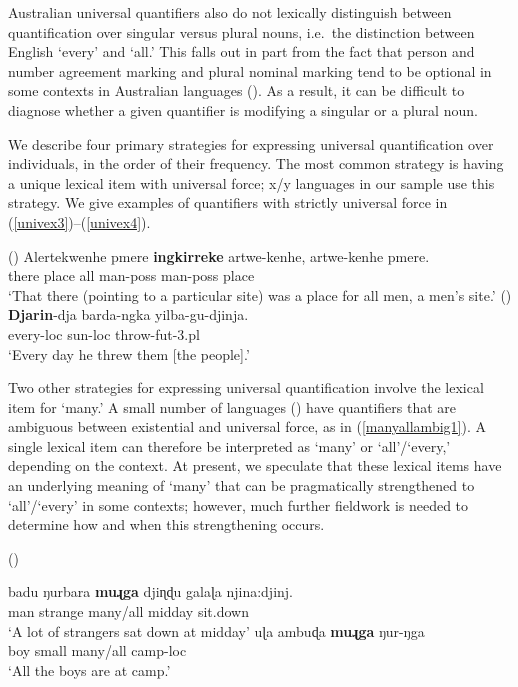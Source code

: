 \documentclass[12pt,egregdoesnotlikesansseriftitles]{scrartcl}
\begin{document}
Australian universal quantifiers also do not lexically distinguish between quantification over singular versus plural nouns, i.e.\ the distinction between English `every' and `all.' This falls out in part from the fact that person and number agreement marking and plural nominal marking tend to be optional in some contexts in Australian languages (). As a result, it can be difficult to diagnose whether a given quantifier is modifying a singular or a  plural noun. %


We describe four primary strategies for expressing universal quantification over individuals, in the order of their frequency. The most common strategy is having a unique lexical item with universal force;  x/y languages in our sample use this strategy. We give examples of quantifiers with strictly universal force in (\ref{univex3})--(\ref{univex4}).

\begin{exe}
   (\citealt[132]{wilkins89})
  \gll Alertekwenhe pmere \textbf{ingkirreke} artwe-kenhe, artwe-kenhe pmere.\\
  there place all man-{\sc poss} man-{\sc poss} place\\
  \glt `That there (pointing to a particular site) was a place for all men, a men's site.' \label{univex3}
   (\citealt[48]{sands89}) 
  \gll \textbf{Djarin}-dja barda-ngka yilba-gu-djinja.\\
  every-{\sc loc} sun-{\sc loc}   throw-{\sc fut}-3.{\sc pl}\\
  \glt `Every day he threw them [the people].' \label{univex4}
\end{exe}

Two other strategies for expressing universal quantification  involve the lexical item for `many.' A small number of languages () have quantifiers that are ambiguous between existential and universal force, as in (\ref{manyallambig1}). A single lexical item can therefore be interpreted as `many' or `all'/`every,' depending on the context. At present, we speculate that these lexical items have an underlying meaning of `many' that can be pragmatically strengthened to `all'/`every' in some contexts; however, much further fieldwork is needed to determine how and when this strengthening occurs.

\begin{exe}
   (\citealt[56,65]{platt72}) \label{manyallambig1}
  \begin{xlist}
    \ex \gll badu ŋurbara \textbf{muɻga} {djiɳɖu galaɭa} njina:djinj. \\ 
    man  strange  many/all  midday         sit.down\\
    \glt `A lot of strangers sat down at midday'
    \ex \gll uɭa ambuɖa \textbf{muɻga} ŋur-ŋga  \\
    boy   small    many/all      camp-{\sc loc}\\
    \glt        `All the boys are at camp.'%
  \end{xlist}
 \end{exe}
 
\end{document}
